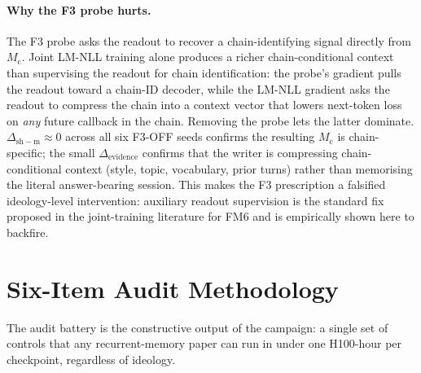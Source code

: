 \documentclass{article}
\newcommand{\Mc}{M_{\mathrm{c}}}
\newcommand{\dsh}{\Delta_{\mathrm{sh-m}}}
\newcommand{\elift}{\Delta_{\mathrm{evidence}}}
\begin{document}
\paragraph{Why the F3 probe hurts.}
The F3 probe asks the readout to recover a chain-identifying signal
directly from $\Mc$.  Joint LM-NLL training alone produces a richer
chain-conditional context than supervising the readout for chain
identification: the probe's gradient pulls the readout toward a
chain-ID decoder, while the LM-NLL gradient asks the readout to
compress the chain into a context vector that lowers next-token loss
on \emph{any} future callback in the chain.  Removing the probe lets
the latter dominate.  $\dsh \approx 0$ across all six F3-OFF seeds
confirms the resulting $\Mc$ is chain-specific; the small $\elift$
confirms that the writer is compressing chain-conditional context
(style, topic, vocabulary, prior turns) rather than memorising the
literal answer-bearing session.  This makes the F3 prescription a
falsified ideology-level intervention: auxiliary readout supervision
is the standard fix proposed in the joint-training literature for
FM6 and is empirically shown here to backfire.

\section{Six-Item Audit Methodology}
\label{sec:methodology}

The audit battery is the constructive output of the campaign: a
single set of controls that any recurrent-memory paper can run in
under one H100-hour per checkpoint, regardless of ideology.
\end{document}

